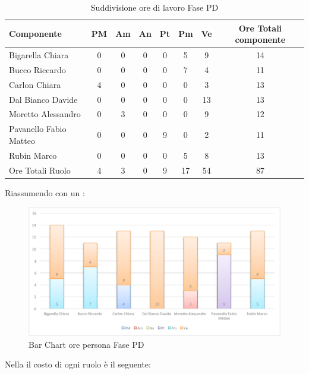 				\begin{table}[H]
					\begin{center}
						\begin{tabular}{| l | c | c | c | c | c | c | c |}
							\hline
							Componente 					& PM	& Am 	& An 	& Pt 		& Pm 	& Ve 		& Ore Totali componente \\ \hline
							
							Bigarella Chiara 			& 0		& 0		& 0		& 0		& 5 		& 9 		& 14 \\
							Bucco Riccardo 				& 0		& 0		& 0		& 0		& 7			& 4 		& 11 \\
							Carlon Chiara	 			& 4 	& 0		& 0		& 0		& 0			& 3 		& 13 \\
							Dal Bianco Davide 			& 0		& 0		& 0		& 0		& 0			& 13 		& 13 \\
							Moretto Alessandro 			& 0		& 3 	& 0		& 0		& 0			& 9 		& 12 \\
							Pavanello Fabio Matteo	 	& 0		& 0		& 0		& 9 	& 0			& 2 		& 11 \\
							Rubin Marco					& 0		& 0		& 0		& 0		& 5 		& 8 		& 13 \\ \hline \hline
							
							Ore Totali Ruolo 			& 4 	& 3 	& 0		& 9 	& 17 		& 54 		& 87\\ \hline
						\end{tabular}
					\end{center}
					\caption{Suddivisione ore di lavoro Fase PD}
				\end{table}
				Riassumendo con un :
				\begin{figure}[H]\centering
					\includegraphics[width=\textwidth]{PianoDiProgetto/Pics/ChartOreFasePD.pdf}
					\caption{Bar Chart ore persona Fase PD}
				\end{figure}
				Nella  il costo di ogni ruolo è il seguente:
